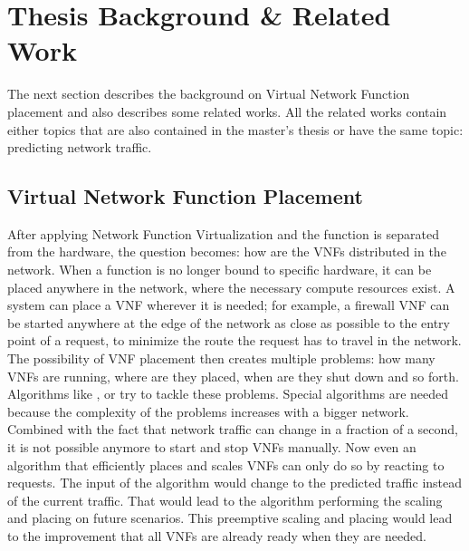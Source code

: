 \section{Thesis Background \& Related Work}        
The next section describes the background on Virtual Network Function placement and also describes some related works.
All the related works contain either topics that are also contained in the master's thesis or have the same topic: predicting network traffic.

\subsection{Virtual Network Function Placement}
After applying Network Function Virtualization and the function is separated from the hardware, the question becomes: how are the VNFs distributed in the network.
When a function is no longer bound to specific hardware, it can be placed anywhere in the network, where the necessary compute resources exist.
A system can place a VNF wherever it is needed; for example, a firewall VNF can be started anywhere at the edge of the network as close as possible to the entry point of a request, to minimize the route the request has to travel in the network.
The possibility of VNF placement then creates multiple problems: how many VNFs are running, where are they placed, when are they shut down and so forth.
Algorithms like \cite{draxlerScaling}, \cite{8486320} or \cite{7335301} try to tackle these problems.
Special algorithms are needed because the complexity of the problems increases with a bigger network.
Combined with the fact that network traffic can change in a fraction of a second, it is not possible anymore to start and stop VNFs manually.
Now even an algorithm that efficiently places and scales VNFs can only do so by reacting to requests.
The input of the algorithm would change to the predicted traffic instead of the current traffic.
That would lead to the algorithm performing the scaling and placing on future scenarios.
This preemptive scaling and placing would lead to the improvement that all VNFs are already ready when they are needed.

